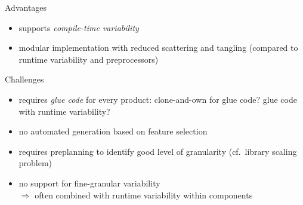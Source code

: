 \newcommand{\MajorChallengesOfComponents}{
	\item requires \emph{glue code} for every product: clone-and-own for glue code? glue code with runtime variability?
	\item no automated generation based on feature selection
	\item requires preplanning to identify good level of granularity (cf.\ library scaling problem)
	\item no support for fine-granular variability\\ $\Rightarrow$ often combined with runtime variability within components
}
\begin{frame}{\myframetitle}
	\begin{mycolumns}[animation=none]
		\begin{note}{Advantages}
			\begin{itemize}
				\item supports \emph{compile-time variability}
				\item modular implementation with reduced scattering and tangling (compared to runtime variability and preprocessors)
			\end{itemize}
		\end{note}
	\mynextcolumn
		\pause
		\begin{note}{Challenges}
			\begin{itemize}
				\MajorChallengesOfComponents
			\end{itemize}
		\end{note}
	\end{mycolumns}
\end{frame}
